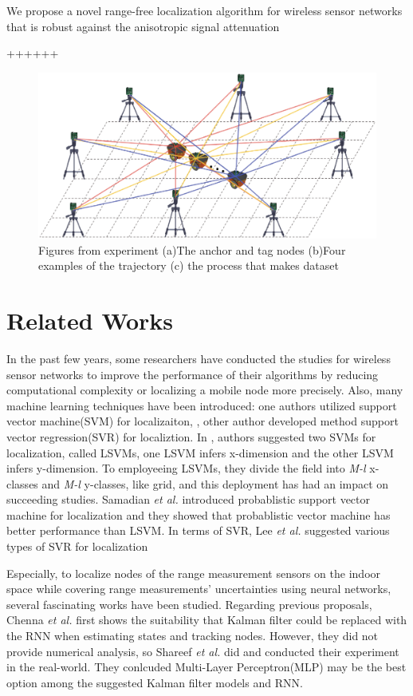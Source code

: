\documentclass{ieeeaccess}
\begin{document}
We propose a novel range-free localization algorithm
for wireless sensor networks that is robust against the anisotropic
signal attenuation

++++++

\begin{figure}[h]
	\centering
	\includegraphics[width=.5\textwidth]{image/Access_overview_figure_1}
	\caption{Figures from experiment (a)The anchor and tag nodes (b)Four examples of the trajectory (c) the process that makes dataset}
	\label{fig:experiment}
\end{figure}

\section{Related Works}

In the past few years, some researchers have conducted the studies for wireless sensor networks to improve the performance of their algorithms by reducing computational complexity or localizing a mobile node more precisely. Also, many machine learning techniques have been introduced: one authors utilized support vector machine(SVM) for localizaiton, \cite{tran2008localization, huan2010three, feng2012determination, afzal2014localization}, other author developed method support vector regression(SVR) for localiztion\cite{lee2013new, lee2013novel}. In \cite{tran2008localization}, authors suggested two SVMs for localization, called LSVMs, one LSVM infers x-dimension and the other LSVM infers y-dimension. To employeeing LSVMs, they divide the field into \textit{M-l} x-classes and \textit{M-l} y-classes, like grid, and this deployment has had an impact on succeeding studies\cite{chatterjee2010fletcher, feng2012determination, afzal2014localization}. Samadian \textit{et al.}\cite{samadian2011probabilistic} introduced probablistic support vector machine for localization and they showed that probablistic vector machine has better performance than LSVM. In terms of SVR, Lee \textit{et al.} suggested various types of SVR for localization\cite{lee2013new, lee2013novel}  

Especially, to localize nodes of the range measurement sensors on the indoor space while covering range measurements' uncertainties using neural networks, several fascinating works have been studied. Regarding previous proposals, Chenna \textit{et al.} first shows the suitability that Kalman filter could be replaced with the RNN when estimating states and tracking nodes\cite{chenna2004state}. However, they did not provide numerical analysis, so Shareef \textit{et al.} did\cite{shareef2008localization} and conducted their experiment in the real-world. They conlcuded Multi-Layer Perceptron(MLP) may be the best option among the suggested Kalman filter models and RNN. 
\end{document}
